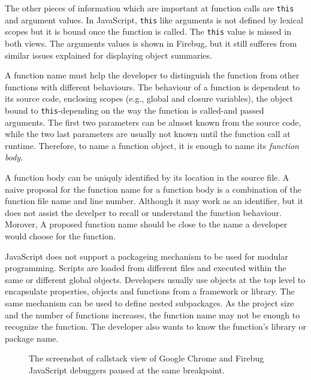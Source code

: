 \documentclass{acm_proc_article-sp}
\begin{document}
The other pieces of information which are important at function calls are {\small\texttt{this}} and argument values. In JavaScript, {\small\texttt{this}} like arguments is not defined by lexical scopes but it is bound once the function is called. The {\small\texttt{this}} value is missed in both views. The arguments values is shown in Firebug, but it still sufferes from similar issues explained for displaying object summaries.

A function name must help the developer to
distinguish the function from other functions with different behaviours. The behaviour of a function is dependent to its source code, enclosing scopes (e.g., global and closure variables), the object bound to {\small\texttt{this}}-depending on the way the function is called-and passed arguments. The first two parameters can be almost known from the source code, while the two last parameters are usually not known until the function call at runtime. Therefore, to name a function object, it is enough to name its \textit{function body}. 

A function body can be uniquly identified by its location in the source file. A naive proposal for the function name for a function body is a combination of the function file name and line number. Although it may work as an identifier, but it does not assist the develper to recall or understand the function behaviour. Morover, A proposed function name should be close to the name a developer would choose for the function.

JavaScript does not support a packageing mechanism to be used for modular programming. Scripts are loaded from different files and executed within the same or different global objects. Developers usually use objects at the top level to encapsulate properties, objects and functions from a framework or library. The same mechanism can be used to define nested subpackages. As the project size and the number of functions increases, the function name may not be enough to recognize the function. The developer also wants to know the function's library or package name. 

\begin{figure}[htp]
\centerline{
\hfil
{}}
\caption{The screenshot of callstack view of Google Chrome and Firebug JavaScript debuggers paused at the same breakpoint.}
\label{debuggers-callstack}
\end{figure}
\end{document}
